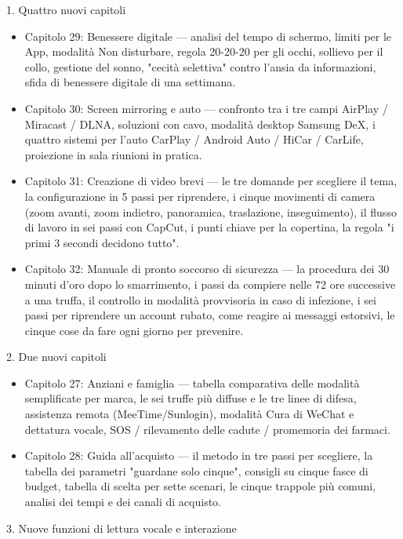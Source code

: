 
1. Quattro nuovi capitoli

\begin{itemize}
  \item Capitolo 29: Benessere digitale — analisi del tempo di schermo, limiti per le App, modalità Non disturbare, regola 20-20-20 per gli occhi, sollievo per il collo, gestione del sonno, "cecità selettiva" contro l'ansia da informazioni, sfida di benessere digitale di una settimana.
  \item Capitolo 30: Screen mirroring e auto — confronto tra i tre campi AirPlay / Miracast / DLNA, soluzioni con cavo, modalità desktop Samsung DeX, i quattro sistemi per l'auto CarPlay / Android Auto / HiCar / CarLife, proiezione in sala riunioni in pratica.
  \item Capitolo 31: Creazione di video brevi — le tre domande per scegliere il tema, la configurazione in 5 passi per riprendere, i cinque movimenti di camera (zoom avanti, zoom indietro, panoramica, traslazione, inseguimento), il flusso di lavoro in sei passi con CapCut, i punti chiave per la copertina, la regola "i primi 3 secondi decidono tutto".
  \item Capitolo 32: Manuale di pronto soccorso di sicurezza — la procedura dei 30 minuti d'oro dopo lo smarrimento, i passi da compiere nelle 72 ore successive a una truffa, il controllo in modalità provvisoria in caso di infezione, i sei passi per riprendere un account rubato, come reagire ai messaggi estorsivi, le cinque cose da fare ogni giorno per prevenire.
\end{itemize}

2. Due nuovi capitoli

\begin{itemize}
  \item Capitolo 27: Anziani e famiglia — tabella comparativa delle modalità semplificate per marca, le sei truffe più diffuse e le tre linee di difesa, assistenza remota (MeeTime/Sunlogin), modalità Cura di WeChat e dettatura vocale, SOS / rilevamento delle cadute / promemoria dei farmaci.
  \item Capitolo 28: Guida all'acquisto — il metodo in tre passi per scegliere, la tabella dei parametri "guardane solo cinque", consigli su cinque fasce di budget, tabella di scelta per sette scenari, le cinque trappole più comuni, analisi dei tempi e dei canali di acquisto.
\end{itemize}

3. Nuove funzioni di lettura vocale e interazione

